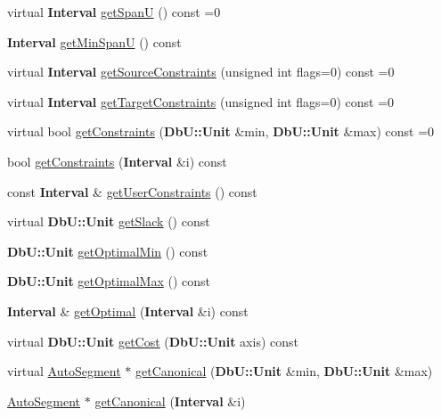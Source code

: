 \begin{DoxyCompactItemize}
\item 
virtual {\bf Interval} \hyperlink{classKatabatic_1_1AutoSegment_a248eb2fbb06e3286650b28567d495f0b}{get\-Span\-U} () const =0
\item 
{\bf Interval} \hyperlink{classKatabatic_1_1AutoSegment_a0599f720e9aac305ecae20c7f4526c58}{get\-Min\-Span\-U} () const 
\item 
virtual {\bf Interval} \hyperlink{classKatabatic_1_1AutoSegment_ab7685e309e1d910db3e8237f8a898c35}{get\-Source\-Constraints} (unsigned int flags=0) const =0
\item 
virtual {\bf Interval} \hyperlink{classKatabatic_1_1AutoSegment_a9c1b8b3cd57fb7b0bf60c7a6148237c2}{get\-Target\-Constraints} (unsigned int flags=0) const =0
\item 
virtual bool \hyperlink{classKatabatic_1_1AutoSegment_a7c2fed22b081f8d3b7a69abb457153ea}{get\-Constraints} ({\bf Db\-U\-::\-Unit} \&min, {\bf Db\-U\-::\-Unit} \&max) const =0
\item 
bool \hyperlink{classKatabatic_1_1AutoSegment_a61a7442901868f6167e5b5303d8f1736}{get\-Constraints} ({\bf Interval} \&i) const 
\item 
const {\bf Interval} \& \hyperlink{classKatabatic_1_1AutoSegment_a5a69d84299029f9fd381a85d9de0a488}{get\-User\-Constraints} () const 
\item 
virtual {\bf Db\-U\-::\-Unit} \hyperlink{classKatabatic_1_1AutoSegment_a15034a21dff23562fd70a83599a16d3a}{get\-Slack} () const 
\item 
{\bf Db\-U\-::\-Unit} \hyperlink{classKatabatic_1_1AutoSegment_a2786cefb5df6ac92dcbb081c55ae50e6}{get\-Optimal\-Min} () const 
\item 
{\bf Db\-U\-::\-Unit} \hyperlink{classKatabatic_1_1AutoSegment_a9bea24981e7eaafb5746015355bf44f7}{get\-Optimal\-Max} () const 
\item 
{\bf Interval} \& \hyperlink{classKatabatic_1_1AutoSegment_abc07fe91810925f4a0191cd245cc85b6}{get\-Optimal} ({\bf Interval} \&i) const 
\item 
virtual {\bf Db\-U\-::\-Unit} \hyperlink{classKatabatic_1_1AutoSegment_aaa87df41319c74dd180039708f68ff7e}{get\-Cost} ({\bf Db\-U\-::\-Unit} axis) const 
\item 
virtual \hyperlink{classKatabatic_1_1AutoSegment}{Auto\-Segment} $\ast$ \hyperlink{classKatabatic_1_1AutoSegment_a8acbe1037827da2c2fef71a18c5886c7}{get\-Canonical} ({\bf Db\-U\-::\-Unit} \&min, {\bf Db\-U\-::\-Unit} \&max)
\item 
\hyperlink{classKatabatic_1_1AutoSegment}{Auto\-Segment} $\ast$ \hyperlink{classKatabatic_1_1AutoSegment_a988beca5780421c168a2475a5298009a}{get\-Canonical} ({\bf Interval} \&i)

\end{DoxyCompactItemize}
